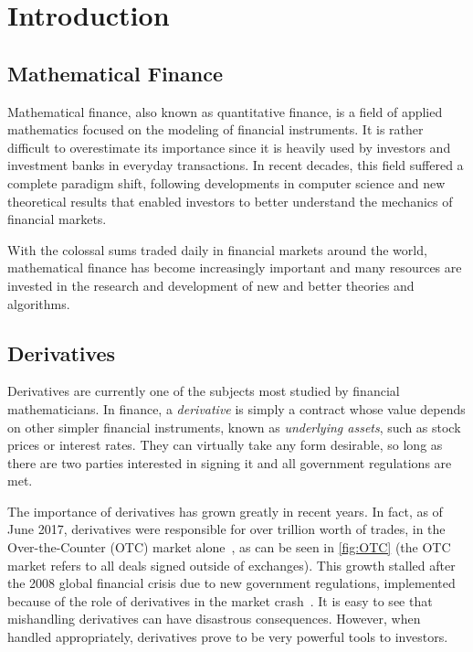 \chapter{Introduction}
\label{chapter:introduction}
\section{Mathematical Finance}
\label{section:mathematical finance}
Mathematical finance, also known as quantitative finance, is a field of applied mathematics focused on the modeling of financial instruments.
It is rather difficult to overestimate its importance since it is heavily used by investors and investment banks in everyday transactions.
In recent decades, this field suffered a complete paradigm shift, following developments in computer science and new theoretical results that enabled investors to better understand the mechanics of financial markets.

With the colossal sums traded daily in financial markets around the world, mathematical finance has become increasingly important and many resources are invested in the research and development of new and better theories and algorithms.


\section{Derivatives}
\label{section:derivatives}
Derivatives are currently one of the subjects most studied by financial mathematicians.
In finance, a \emph{derivative} is simply a contract whose value depends on other simpler financial instruments, known as \emph{underlying assets}, such as stock prices or interest rates.
They can virtually take any form desirable, so long as there are two parties interested in signing it and all government regulations are met.


The importance of derivatives has grown greatly in recent years. In fact, as of June 2017, derivatives were responsible for over  trillion worth of trades, in the Over-the-Counter (OTC) market alone~\cite{BIS}, as can be seen in \autoref{fig:OTC} (the OTC market refers to all deals signed outside of exchanges).
This growth stalled after the 2008 global financial crisis due to new government regulations, implemented because of the role of derivatives in the market crash~\cite{FT}. It is easy to see that mishandling derivatives can have disastrous consequences. However, when handled appropriately, derivatives prove to be very powerful tools to investors.


